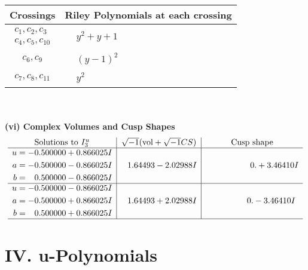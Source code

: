 \documentclass[1p]{elsarticle_modified}
\theoremstyle{definition}
\newcommand{\I}{\sqrt{-1}}
\begin{document}
\begin{tabular}{m{50pt}|m{274pt}}
Crossings & \hspace{64pt}Riley Polynomials at each crossing \\
\hline $$\begin{aligned}c_{1},c_{2},c_{3}\\c_{4},c_{5},c_{10}\end{aligned}$$&$\begin{aligned}
&y^2+y+1
\end{aligned}$\\
\hline $$\begin{aligned}c_{6},c_{9}\end{aligned}$$&$\begin{aligned}
&(y-1)^2
\end{aligned}$\\
\hline $$\begin{aligned}c_{7},c_{8},c_{11}\end{aligned}$$&$\begin{aligned}
&y^2
\end{aligned}$\\
\hline
\end{tabular}\\~\\
\newpage\flushleft \textbf{(vi) Complex Volumes and Cusp Shapes}
$$\begin{array}{c|c|c}  
\text{Solutions to }I^u_{3}& \I (\text{vol} + \sqrt{-1}CS) & \text{Cusp shape}\\
 \hline 
\begin{aligned}
u &= -0.500000 + 0.866025 I \\
a &= -0.500000 - 0.866025 I \\
b &= \phantom{-}0.500000 - 0.866025 I\end{aligned}
 & \phantom{-}1.64493 - 2.02988 I & \phantom{-0.000000 -}0. + 3.46410 I \\ \hline\begin{aligned}
u &= -0.500000 - 0.866025 I \\
a &= -0.500000 + 0.866025 I \\
b &= \phantom{-}0.500000 + 0.866025 I\end{aligned}
 & \phantom{-}1.64493 + 2.02988 I & \phantom{-0.000000 } 0. - 3.46410 I\\
 \hline 
 \end{array}$$\newpage
\newpage\renewcommand{\arraystretch}{1}
\centering \section*{ IV. u-Polynomials}
\end{document}
